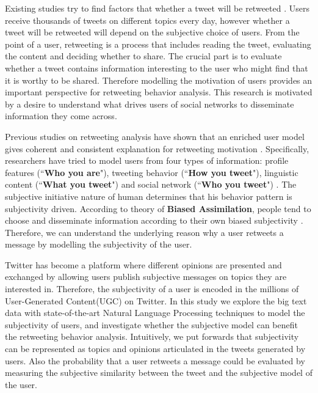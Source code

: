 \documentclass[letterpaper]{article}
\begin{document}
Existing studies try to find factors that whether a tweet will be retweeted \cite{Boyd2010,Kwak:2010TSN,Suh2010}. 
Users receive thousands of tweets on different topics every day, however whether a tweet will be retweeted will depend on the subjective choice of users. 
From the point of a user, retweeting is a process that includes reading the tweet, evaluating the content and deciding whether to share. The crucial part is to evaluate whether a tweet contains information interesting to the user who might find that it is worthy to be shared.  
Therefore modelling the motivation of users provides an important perspective for retweeting behavior analysis. 
This research is motivated by a desire to understand what drives users of social networks to disseminate information they come across. 

Previous studies on retweeting analysis have shown that an enriched user model gives coherent and consistent explanation for retweeting motivation \cite{conf/icwsm/MacskassyM11,conf/wsdm/FengW13}. 
Specifically, researchers have tried to model users from four types of information:
profile features (``\textbf{Who you are}"), tweeting behavior (``\textbf{How you tweet}"), linguistic content (``\textbf{What you tweet}") and social network (``\textbf{Who you tweet}") \cite{Pennacchiotti:icwsm11}. 
The subjective initiative nature of human determines that his behavior pattern is subjectivity driven. 
According to theory of \textbf{Biased Assimilation}, people tend to choose and disseminate information according to their own biased subjectivity \cite{Hyman2000}. 
Therefore, we can understand the underlying reason why a user retweets a message by modelling the subjectivity of the user. 

Twitter has become a platform where different opinions are presented and exchanged by allowing users publish subjective messages on topics they are interested in. 
Therefore, the subjectivity of a user is encoded in the millions of User-Generated Content(UGC) on Twitter. 
In this study we explore the big text data with state-of-the-art Natural Language Processing techniques to model the subjectivity of users, and investigate whether the subjective model can benefit the retweeting behavior analysis. 
Intuitively, we put forwards that subjectivity can be represented as topics and opinions articulated in the tweets generated by users. 
Also the probability that a user retweets a message could be evaluated by measuring the subjective similarity between the tweet and the subjective model of the user. 
\end{document}
